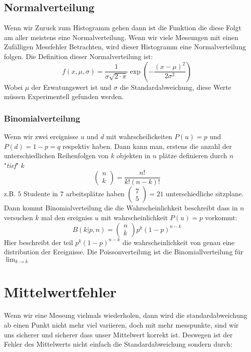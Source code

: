 \documentclass{article}
\begin{document}
\hypertarget{Normalverteilung}{\subsection*{Normalverteilung}}
Wenn wir Zuruck zum Histogramm gehen dann ist die Funktion die diese Folgt am aller meistens eine Normalverteilung. Wenn wir viele Messungen mit einen Zufälligen Messfehler Betrachten, wird dieser Histogramm eine Normalverteilung folgen.
Die Definition dieser Normalverteilung ist:
\[f(x,\mu,\sigma)=\frac{1}{\sigma\sqrt{2\cdot\pi}}\exp\left(-\frac{(x-\mu)^2}{2\sigma^2}\right)\]
Wobei $\mu$ der Erwatungswert ist und $\sigma$ die Standardabweichung, diese Werte müssen Experimentell gefunden werden.
\hypertarget{Binomialverteilung}{\subsubsection*{Binomialverteilung}}
Wenn wir zwei ereignisse $u$ und $d$ mit wahrscheilickeiten $P(u)=p$ und $P(d)=1-p=q$ respektiv haben. Dann kann man, erstens die anzahl der unterschiedlichen Reihenfolgen von $k$ objekten in $n$ plätze definieren durch $n$ "\textit{tief}" $k$\[\begin{pmatrix}n\\k\end{pmatrix}=\frac{n!}{k!(n-k)!}\] z.B. $5$ Studente in $7$ arbeitsplätze haben $\begin{pmatrix}7\\5\end{pmatrix}=21$ unterschiedliche sitzplane.
Dann kommt Binomialverteilung die die Wahrscheinlichkeit beschreibt dass in $n$ versuchen $k$ mal den ereigniss $u$ mit wahrscheinlichkeit $P(u)=p$ vorkommt:
\[B(k|p,n)=\begin{pmatrix}n\\k\end{pmatrix}p^k(1-p)^{n-k}\] Hier beschreibt der teil $p^k(1-p)^{n-k}$ die wahrscheinlichkeit von genau eine distribution der Ereignisse.
Die Poissonverteilung ist die Binomiallverteilung für $\lim_{k\rightarrow k}$
\hypertarget{mittelwertfehler}{\section*{Mittelwertfehler}}
Wenn wir eine Messung vielmals wiederholen, dann wird die standardabweichung ab einen Punkt nicht mehr viel variieren, doch mit mehr messpunkte, sind wir uns sicherer und sicherer dass unser Mittelwert korrekt ist. Deswegen ist der Fehler des Mittelwerts nicht einfach die Standardabweichung sondern durch:
\end{document}
